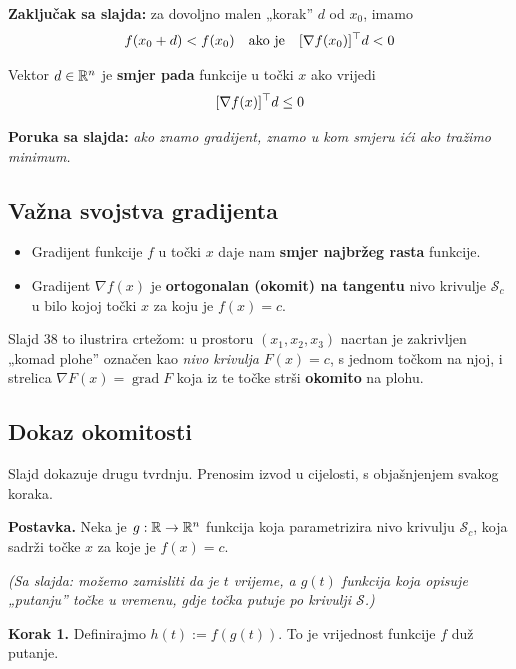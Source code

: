 \textbf{Zaključak sa slajda:} za dovoljno malen „korak” $d$ od $x_0$, imamo
\[
f(x_0 + d) < f(x_0) \quad\text{ako je}\quad [\nabla f(x_0)]^{\top} d < 0
\]

\begin{definicija}
Vektor $d \in \mathbb{R}^n$ je \textbf{smjer pada} funkcije u točki $x$ ako vrijedi
\[
[\nabla f(x)]^{\top} d \le 0
\]
\end{definicija}

\textbf{Poruka sa slajda:} \emph{ako znamo gradijent, znamo u kom smjeru ići
ako tražimo minimum.}

\subsection{Važna svojstva gradijenta}

\begin{teorem}
\begin{itemize}
  \item Gradijent funkcije $f$ u točki $x$ daje nam \textbf{smjer najbržeg
        rasta} funkcije.
  \item Gradijent $\nabla f(x)$ je \textbf{ortogonalan (okomit) na tangentu}
        nivo krivulje $\mathcal{S}_c$ u bilo kojoj točki $x$ za koju je
        $f(x) = c$.
\end{itemize}
\end{teorem}

Slajd 38 to ilustrira crtežom: u prostoru $(x_1, x_2, x_3)$ nacrtan je zakrivljen
„komad plohe” označen kao \emph{nivo krivulja} $F(x) = c$, s jednom točkom na
njoj, i strelica $\nabla F(x) = \operatorname{grad} F$ koja iz te točke strši
\textbf{okomito} na plohu.

\subsection{Dokaz okomitosti}

Slajd dokazuje drugu tvrdnju. Prenosim izvod u cijelosti, s objašnjenjem svakog
koraka.

\textbf{Postavka.} Neka je $g : \mathbb{R} \to \mathbb{R}^n$ funkcija koja parametrizira nivo
krivulju $\mathcal{S}_c$, koja sadrži točke $x$ za koje je $f(x) = c$.

\emph{(Sa slajda: možemo zamisliti da je $t$ vrijeme, a $g(t)$ funkcija koja
opisuje „putanju” točke u vremenu, gdje točka putuje po krivulji
$\mathcal{S}$.)}

\textbf{Korak 1.} Definirajmo $h(t) := f(g(t))$. To je vrijednost funkcije $f$
duž putanje.

